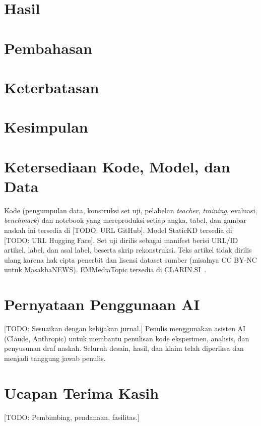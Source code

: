 \documentclass[journal]{IEEEtran}
\DeclareRobustCommand{\todo}[1]{{\color{red}[TODO: #1]}}
\newcommand{\eng}[1]{\textit{#1}}   %
\begin{document}
\section{Hasil}
\label{sec:results}


\section{Pembahasan}
\label{sec:discussion}


\section{Keterbatasan}
\label{sec:limitations}


\section{Kesimpulan}
\label{sec:conclusion}


\section*{Ketersediaan Kode, Model, dan Data}
Kode (pengumpulan data, konstruksi set uji, pelabelan \eng{teacher}, \eng{training}, evaluasi, \eng{benchmark}) dan notebook yang mereproduksi setiap angka, tabel, dan gambar naskah ini tersedia di \todo{URL GitHub}. Model StaticKD tersedia di \todo{URL Hugging Face}. Set uji dirilis sebagai manifest berisi URL/ID artikel, label, dan asal label, beserta skrip rekonstruksi. Teks artikel tidak dirilis ulang karena hak cipta penerbit dan lisensi dataset sumber (misalnya CC BY-NC untuk MasakhaNEWS). EMMediaTopic tersedia di CLARIN.SI~\cite{emmediatopic2025}.

\section*{Pernyataan Penggunaan AI}
\todo{Sesuaikan dengan kebijakan jurnal.} Penulis menggunakan asisten AI (Claude, Anthropic) untuk membantu penulisan kode eksperimen, analisis, dan penyusunan draf naskah. Seluruh desain, hasil, dan klaim telah diperiksa dan menjadi tanggung jawab penulis.

\section*{Ucapan Terima Kasih}
\todo{Pembimbing, pendanaan, fasilitas.}



\end{document}
